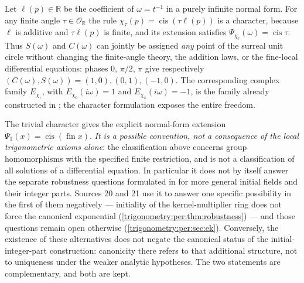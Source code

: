 \documentclass[11pt,letterpaper]{article}
\numberwithin{equation}{section}
\theoremstyle{definition}
\theoremstyle{remark}
\newcommand{\R}{\mathbb R}
\newcommand{\OO}{\mathcal O}
\newcommand{\fin}{\operatorname{fin}}
\newcommand{\cis}{\operatorname{cis}}
\begin{document}
\begin{example}\label{trigonometry:ex:phases}
Let $\ell(p)\in\R$ be the coefficient of $\omega=t^{-1}$ in a purely infinite normal form. For any
finite angle $\tau\in\OO_{\R}$ the rule $\chi_\tau(p)=\cis(\tau\ell(p))$ is a character, because
$\ell$ is additive and $\tau\ell(p)$ is finite, and its extension satisfies
$\Psi_{\chi_\tau}(\omega)=\cis\tau$. Thus $S(\omega)$ and $C(\omega)$ can jointly be assigned
\emph{any} point of the surreal unit circle without changing the finite-angle theory, the addition
laws, or the fine-local differential equations: phases $0$, $\pi/2$, $\pi$ give respectively
$(C(\omega),S(\omega))=(1,0),(0,1),(-1,0)$. The corresponding complex family
$E_{\chi_\tau}$, with $E_{\chi_0}(i\omega)=1$ and $E_{\chi_\pi}(i\omega)=-1$, is the family already
constructed in \cite{SourceAnalysis}; the character formulation exposes the entire freedom.
\end{example}
The trivial character gives the explicit normal-form extension $\Psi_1(x)=\cis(\fin x)$. \emph{It
is a possible convention, not a consequence of the local trigonometric axioms alone}: the
classification above concerns group homomorphisms with the specified finite restriction, and is not
a classification of all solutions of a differential equation. In particular it does not by itself
answer the separate robustness questions formulated in \cite[\S11]{EK} for more general initial
fields and their integer parts. Sources 20 and 21 use it to answer one specific possibility in the
first of them negatively --- initiality of the kernel-multiplier ring does not force the canonical
exponential (\cref{trigonometry:per:thm:robustness}) --- and those questions remain open otherwise
(\cref{trigonometry:per:sec:ek}). Conversely, the existence of these alternatives does not negate the canonical
status of the initial-integer-part construction: canonicity there refers to that additional
structure, not to uniqueness under the weaker analytic hypotheses. The two statements are
complementary, and both are kept.
\end{document}
